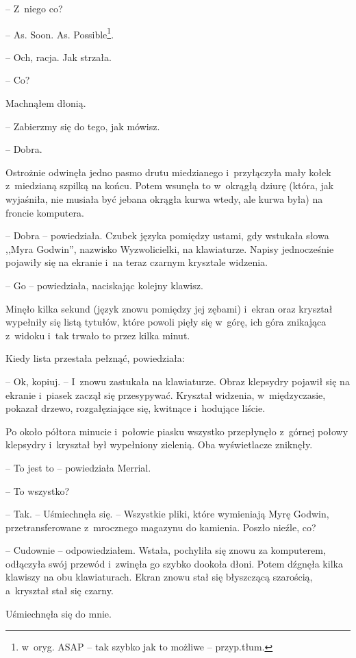 \documentclass[oneside,polish,11pt,sfheadings]{mwbk}
\begin{document}
-- Z~niego co?

-- As. Soon. As. Possible\footnote{ w~oryg. ASAP -- tak szybko jak to możliwe -- przyp.tłum.}.

-- Och, racja. Jak strzała.

-- Co?

Machnąłem dłonią. 

-- Zabierzmy się do tego, jak mówisz.

-- Dobra.

Ostrożnie odwinęła jedno pasmo drutu miedzianego i~przyłączyła mały
kołek z~miedzianą szpilką na końcu. Potem wsunęła to w~okrągłą dziurę
(która, jak wyjaśniła, nie musiała być jebana okrągła kurwa wtedy, ale
kurwa była) na froncie komputera.

-- Dobra -- powiedziała. Czubek języka pomiędzy ustami, gdy wstukała słowa
,,Myra Godwin'', nazwisko Wyzwolicielki, na klawiaturze. Napisy
jednocześnie pojawiły się na ekranie i~na teraz czarnym krysztale
widzenia.

-- Go -- powiedziała, naciskając kolejny klawisz.

Minęło kilka sekund (język znowu pomiędzy jej zębami) i~ekran oraz
kryształ wypełniły się listą tytułów, które powoli pięły się w~górę, ich
góra znikająca z~widoku i~tak trwało to przez kilka minut.

Kiedy lista przestała pełznąć, powiedziała: 

-- Ok, kopiuj. -- I~znowu
zastukała na klawiaturze. Obraz klepsydry pojawił się na ekranie i~piasek zaczął się przesypywać. Kryształ widzenia, w~międzyczasie,
pokazał drzewo, rozgałęziające się, kwitnące i~hodujące liście.

Po około półtora minucie i~połowie piasku wszystko przepłynęło z~górnej
połowy klepsydry i~kryształ był wypełniony zielenią. Oba wyświetlacze
zniknęły.

-- To jest to -- powiedziała Merrial.

-- To wszystko?

-- Tak. -- Uśmiechnęła się. -- Wszystkie pliki, które wymieniają Myrę
Godwin, przetransferowane z~mrocznego magazynu do kamienia. Poszło
nieźle, co?

-- Cudownie -- odpowiedziałem. Wstała, pochyliła się znowu za komputerem,
odłączyła swój przewód i~zwinęła go szybko dookoła dłoni. Potem dźgnęła
kilka klawiszy na obu klawiaturach. Ekran znowu stał się błyszczącą
szarością, a~kryształ stał się czarny.

Uśmiechnęła się do mnie. 
\end{document}

